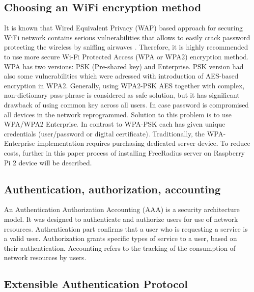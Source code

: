 \documentclass{llncs}
\begin{document}
\subsection{Choosing an WiFi encryption method}
It is known that Wired Equivalent Privacy (WAP) based approach for securing WiFi network contains serious vulnerabilities that allows to easily crack password protecting the wireless by sniffing airwaves
\cite{WebDeadAgain}. Therefore, it is highly recommended to use more secure Wi-Fi Protected Access (WPA or WPA2) encryption method. WPA has two versions: PSK (Pre-shared key) and Enterprise. PSK version had also some vulnerabilities \cite{WpaPskVulnerabilities} which were adressed with introduction of AES-based encryption in WPA2. Generally, using WPA2-PSK AES together with complex, non-dictionary pass-phrase is considered as safe solution, but it has significant drawback of using common key across all users.
In case password is compromised all devices in the network reprogrammed. Solution to this problem is to use WPA/WPA2 Enterprise. In contrast to WPA-PSK each has given unique credentials (user/password or digital certificate). Traditionally, the WPA-Enterprise implementation requires purchasing dedicated server device. To reduce costs, further in this paper process of installing FreeRadius server on Raspberry Pi 2 device will be described.

\subsection{Authentication, authorization, accounting}

An Authentication Authorization Accounting (AAA) \cite{rfc2903}\cite{rfc2904} is a security architecture model. It was designed to authenticate and authorize users for use of network resources. Authentication part confirms that a user who is requesting a service is a valid user. Authorization grants specific types of service to a user, based on their authentication. Accounting refers to the tracking of the consumption of network resources by users.

\subsection{Extensible Authentication Protocol}
\end{document}
